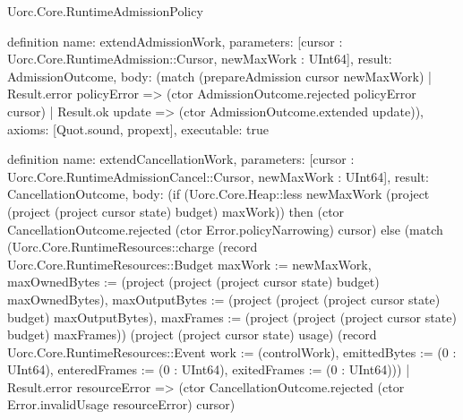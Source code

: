 \begin{lexlean}{Uorc.Core.RuntimeAdmissionPolicy}
\begin{semanticmodule}
definition{
  name: extendAdmissionWork,
  parameters: [cursor : Uorc.Core.RuntimeAdmission::Cursor, newMaxWork : UInt64],
  result: AdmissionOutcome,
  body: (match (prepareAdmission cursor newMaxWork)
    | Result.error policyError => (ctor AdmissionOutcome.rejected policyError cursor)
    | Result.ok update => (ctor AdmissionOutcome.extended update)),
  axioms: [Quot.sound, propext],
  executable: true
}

definition{
  name: extendCancellationWork,
  parameters: [cursor : Uorc.Core.RuntimeAdmissionCancel::Cursor, newMaxWork : UInt64],
  result: CancellationOutcome,
  body: (if (Uorc.Core.Heap::less newMaxWork (project (project (project cursor state) budget) maxWork)) then (ctor CancellationOutcome.rejected (ctor Error.policyNarrowing) cursor) else (match (Uorc.Core.RuntimeResources::charge (record Uorc.Core.RuntimeResources::Budget {maxWork := newMaxWork, maxOwnedBytes := (project (project (project cursor state) budget) maxOwnedBytes), maxOutputBytes := (project (project (project cursor state) budget) maxOutputBytes), maxFrames := (project (project (project cursor state) budget) maxFrames)}) (project (project cursor state) usage) (record Uorc.Core.RuntimeResources::Event {work := (controlWork), emittedBytes := (0 : UInt64), enteredFrames := (0 : UInt64), exitedFrames := (0 : UInt64)}))
    | Result.error resourceError => (ctor CancellationOutcome.rejected (ctor Error.invalidUsage resourceError) cursor)
}
\end{semanticmodule}
\end{lexlean}
